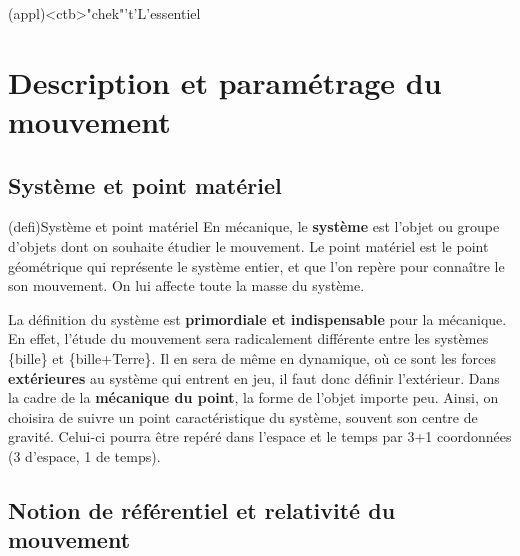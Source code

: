 \documentclass[../../main/main.tex]{subfiles}
\begin{document}
\vspace*{\fill}
\newpage
\vspace*{\fill}

\begin{tcn}[%
		sidebyside, fontupper=\small, fontlower=\small
	](appl)<ctb>"chek"'t'{L'essentiel}
	\tcblower
\end{tcn}

\vspace*{\fill}

\newpage

\section{Description et paramétrage du mouvement}
\subsection{Système et point matériel}
\begin{tcb}(defi){Système et point matériel}
	En mécanique, le \textbf{système} est l'objet ou groupe
	d'objets dont on souhaite étudier le mouvement.
	\smallbreak
	Le point matériel est le point géométrique qui représente le système entier,
	et que l'on repère pour connaître le son mouvement. On lui affecte toute la
	masse du système.
\end{tcb}

La définition du système est \textbf{primordiale et indispensable} pour la
mécanique. En effet, l'étude du mouvement sera radicalement différente entre les
systèmes \{bille\} et \{bille+Terre\}. Il en sera de même en dynamique, où ce
sont les forces \textbf{extérieures} au système qui entrent en jeu, il faut donc
définir l'extérieur.
\bigbreak
Dans la cadre de la \textbf{mécanique du point}, la forme de l'objet importe
peu. Ainsi, on choisira de suivre un point caractéristique du système, souvent
son centre de gravité. Celui-ci pourra être repéré dans l'espace et le temps par
3+1 coordonnées (3 d'espace, 1 de temps).

\subsection{Notion de référentiel et relativité du mouvement}
\end{document}

